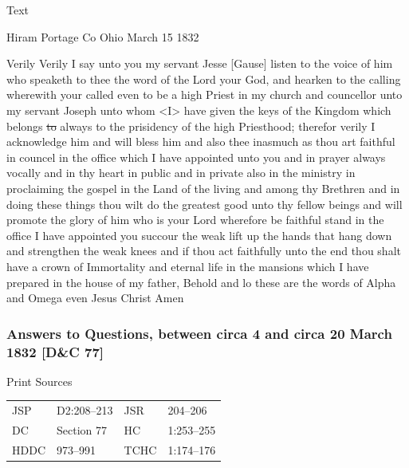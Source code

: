 			\begin{description}
				\item[Text]
			\end{description}
			
				Hiram Portage Co Ohio March 15 1832

				Verily Verily I say unto you my servant Jesse [Gause] listen to the voice of him who speaketh to thee the word of the Lord your God, and hearken to the calling wherewith your called even to be a high Priest in my church and councellor unto my servant Joseph unto whom <I> have given the keys of the Kingdom which belongs \sout{to} always to the prisidency of the high Priesthood; therefor verily I acknowledge him and will bless him and also thee inasmuch as thou art faithful in councel in the office which I have appointed unto you and in prayer always vocally and in thy heart in public and in private also in the ministry in proclaiming the gospel in the Land of the living and among thy Brethren and in doing these things thou wilt do the greatest good unto thy fellow beings and will promote the glory of him who is your Lord wherefore be faithful stand in the office I have appointed you succour the weak lift up the hands that hang down and strengthen the weak knees and if thou act faithfully unto the end thou shalt have a crown of Immortality and eternal life in the mansions which I have prepared in the house of my father, Behold and lo these are the words of Alpha and Omega even Jesus Christ Amen
				
		\subsubsection{Answers to Questions, between circa 4 and circa 20 March 1832 [D\&C 77]}
			\label{EMS-1832-JS-CIR-4-MAR-1832}
		
			\begin{description}
				\item[Print Sources]
			\end{description}

				\begin{tabular}{p{0.5in}p{1in}p{0.5in}p{1in}}
				JSP	 	& D2:208--213	& JSR 		& 204--206 \\
				DC	 	& Section 77 	& HC 		& 1:253--255 \\
				HDDC 	& 973--991		& TCHC 		& 1:174--176 \\
				\end{tabular}
			
